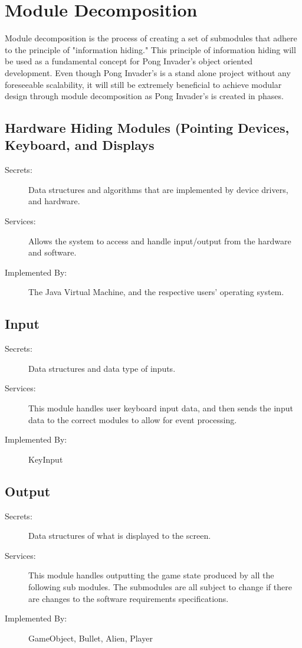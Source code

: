 \documentclass[12pt, titlepage]{article}
\begin{document}
\section{Module Decomposition} \label{SecMD}
Module decomposition is the process of creating a set of submodules that adhere to the principle of  "information hiding." This principle of information hiding will be used as a fundamental concept for Pong Invader's object oriented development. Even though Pong Invader's is a stand alone project without any foreseeable scalability, it will still be extremely beneficial to achieve modular design through module decomposition as Pong Invader's is created in phases.

\subsection{Hardware Hiding Modules (Pointing Devices, Keyboard, and Displays}
\begin{description}
\item[Secrets:] Data structures and algorithms that are implemented by device drivers, and hardware.
\item[Services:] Allows the system to access and handle input/output from the hardware and software.
\item[Implemented By:] The Java Virtual Machine, and the respective users' operating system.
\end{description}

\subsection{Input}
\begin{description}
\item[Secrets:] Data structures and data type of inputs.
\item[Services:] This module handles user keyboard input data, and then sends the input data to the correct modules to allow for event processing.
\item[Implemented By:] KeyInput
\end{description}

\subsection{Output}
\begin{description}
\item[Secrets:] Data structures of what is displayed to the screen.
\item[Services:] This module handles outputting the game state produced by all the following sub modules. The submodules are all subject to change if there are changes to the software requirements specifications.
\item[Implemented By:] GameObject, Bullet, Alien, Player
\end{description}
\end{document}
